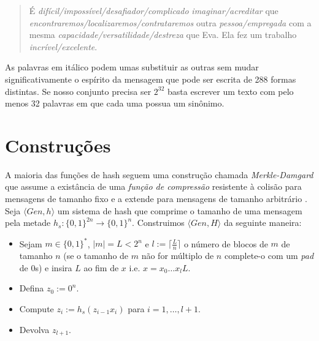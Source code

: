 \begin{quote}
  É {\em difícil/impossível/desafiador/complicado} {\em imaginar/acreditar} que {\em encontraremos/localizaremos/contrataremos} outra {\em pessoa/empregada} com a mesma {\em capacidade/versatilidade/destreza} que Eva.
Ela fez um trabalho {\em incrível/excelente}.
\end{quote}


As palavras em itálico podem umas substituir as outras sem mudar significativamente o espírito da mensagem que pode ser escrita de 288 formas distintas.
Se nosso conjunto precisa ser $2^{32}$ basta escrever um texto com pelo menos 32 palavras em que cada uma possua um sinônimo.
 
\section{Construções}
\label{sec:construcoes}

A maioria das funções de hash seguem uma construção chamada {\em Merkle-Damgard} que assume a existância de uma {\em função de compressão} resistente à colisão para mensagens de tamanho fixo e a extende para mensagens de tamanho arbitrário \cite{Merkle89,Damgard89}.
Seja $\langle Gen, h \rangle$ um sistema de hash que comprime o tamanho de uma mensagem pela metade $h_s:\{0,1\}^{2n} \to \{0,1\}^n$.
Construimos $\langle Gen, H \rangle$ da seguinte maneira:
\begin{itemize}
\item Sejam $m \in \{0,1\}^*$, $|m| = L < 2^n$ e $l := \lceil \frac{L}{n} \rceil$ o número de blocos de $m$ de tamanho $n$ (se o tamanho de $m$ não for múltiplo de $n$ complete-o com um {\em pad} de $0$s) e insira $L$ ao fim de $x$ i.e. $x = x_0 \dots x_l L$.
\item Defina $z_0 := 0^n$.
\item Compute $z_i := h_s(z_{i-1}x_i)$ para $i = 1, \dots, l + 1$.
\item Devolva $z_{l+1}$.
\end{itemize}

\begin{center}
\end{center}


